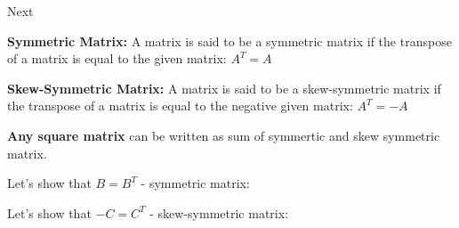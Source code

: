 \documentclass{article}
\begin{document}
Next




\textbf{Symmetric Matrix:} A matrix is said to be a symmetric matrix if the transpose of a matrix is equal to the given matrix: $A^T = A$


\textbf{Skew-Symmetric Matrix:} A matrix is said to be a skew-symmetric matrix if the transpose of a matrix is equal to the negative given matrix: $A^T = -A$



\textbf{Any square matrix} can be written as sum of symmertic and skew symmetric matrix.


Let's show that $B = B^T$ - symmetric matrix:


Let's show that $-C = C^T$ - skew-symmetric matrix:


\end{document}
